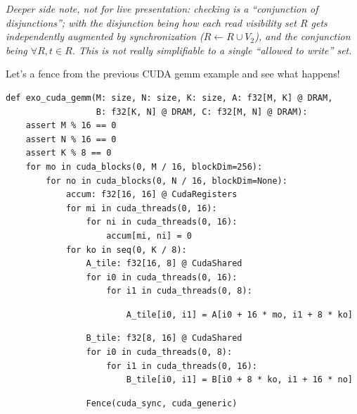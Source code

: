 \hfill
\begin{minipage}[t]{0.7\textwidth}\fixminipage
\vspace{6mm}
\textit{Deeper side note, not for live presentation:  checking is a ``conjunction of disjunctions''; with the disjunction being how each read visibility set $R$ gets independently augmented by synchronization ($R \leftarrow R \cup V_2$), and the conjunction being $\forall R, t \in R$.
This is not really simplifiable to a single ``allowed to write'' set.}
\end{minipage}

\newpage
{}

\begin{minipage}[t]{0.4\textwidth}\codeminipage
Let's  a fence from the previous CUDA gemm example and see what happens!
\vspace{6mm}
\tiny
\begin{verbatim}
def exo_cuda_gemm(M: size, N: size, K: size, A: f32[M, K] @ DRAM,
                  B: f32[K, N] @ DRAM, C: f32[M, N] @ DRAM):
    assert M % 16 == 0
    assert N % 16 == 0
    assert K % 8 == 0
    for mo in cuda_blocks(0, M / 16, blockDim=256):
        for no in cuda_blocks(0, N / 16, blockDim=None):
            accum: f32[16, 16] @ CudaRegisters
            for mi in cuda_threads(0, 16):
                for ni in cuda_threads(0, 16):
                    accum[mi, ni] = 0
            for ko in seq(0, K / 8):
                A_tile: f32[16, 8] @ CudaShared
                for i0 in cuda_threads(0, 16):
                    for i1 in cuda_threads(0, 8):
\end{verbatim}
\begin{mdframed}[style=MyFrame, backgroundcolor=yellowBoxBg]
\color{yellowBoxFg}
\begin{verbatim}
                        A_tile[i0, i1] = A[i0 + 16 * mo, i1 + 8 * ko]
\end{verbatim}
\end{mdframed}
\begin{verbatim}
                B_tile: f32[8, 16] @ CudaShared
                for i0 in cuda_threads(0, 8):
                    for i1 in cuda_threads(0, 16):
                        B_tile[i0, i1] = B[i0 + 8 * ko, i1 + 16 * no]
\end{verbatim}
\begin{mdframed}[style=MyFrame, backgroundcolor=greenBoxBg]
\color{greenBoxFg}
\begin{verbatim}
                Fence(cuda_sync, cuda_generic)

\end{verbatim}
\end{mdframed}
\end{minipage}
